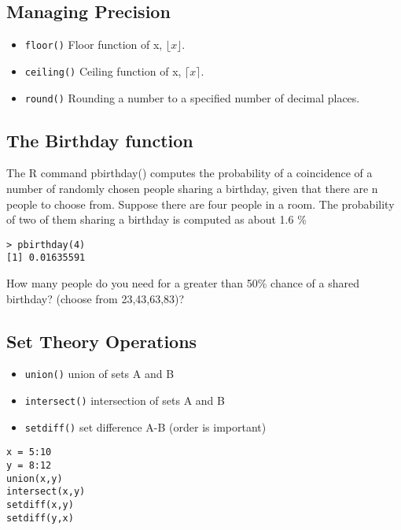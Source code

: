 \documentclass[a4paper,12pt]{article}
\begin{document}
\subsection{Managing Precision}

\begin{itemize}
\item \texttt{floor()} Floor function of x, $\lfloor x \rfloor$.
\item \texttt{ceiling()} Ceiling function of x, $\lceil x \rceil$.
\item \texttt{round()} Rounding a number to a specified number of decimal places.
\end{itemize}
\subsection{The Birthday function}
The R command pbirthday() computes the probability of a coincidence of a number of randomly chosen people sharing a birthday, given that there are n people to choose from.
Suppose there are four people in a room. The probability of two of them sharing a birthday is computed as about 1.6 \%
\begin{verbatim}
> pbirthday(4)
[1] 0.01635591
\end{verbatim}

How many people do you need for a greater than 50\% chance of a shared birthday? (choose from 23,43,63,83)?

\subsection{Set Theory Operations}
\begin{itemize}
\item \texttt{union()} union of sets A and B
\item \texttt{intersect()} intersection of sets A and B
\item \texttt{setdiff()} set difference A-B (order is important)
\end{itemize}

\begin{framed}
\begin{verbatim}
x = 5:10
y = 8:12
union(x,y)
intersect(x,y)
setdiff(x,y)
setdiff(y,x)
\end{verbatim}
\end{framed}


\end{document}
